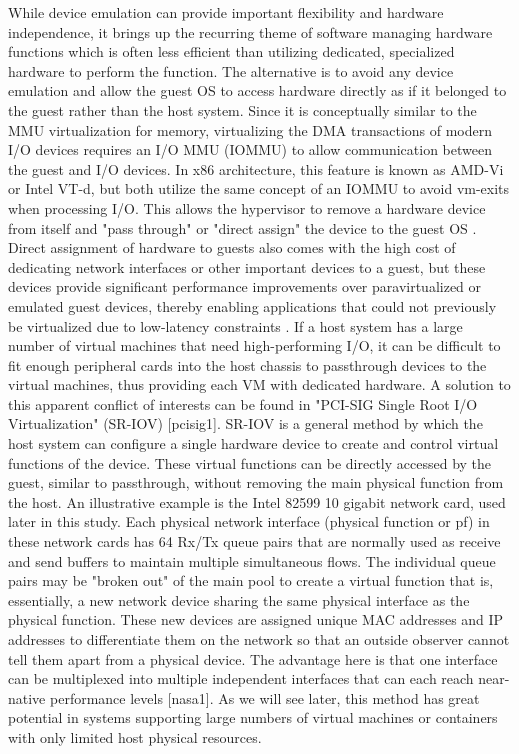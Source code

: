 While device emulation can provide important flexibility and hardware independence, it brings up the recurring theme of software managing hardware functions which is often less efficient than utilizing dedicated, specialized hardware to perform the function.  The alternative is to avoid any device emulation and allow the guest OS to access hardware directly as if it belonged to the guest rather than the host system.   Since it is conceptually similar to the MMU virtualization for memory, virtualizing the DMA transactions of modern I/O devices requires an I/O MMU (IOMMU) to allow communication between the guest and I/O devices.  In x86 architecture, this feature is known as AMD-Vi or Intel VT-d, but both utilize the same concept of an IOMMU to avoid vm-exits when processing I/O.  This allows the hypervisor to remove a hardware device from itself and "pass through" or "direct assign" the device to the guest OS \autocite{_jones_1}.  Direct assignment of hardware to guests also comes with the high cost of dedicating network interfaces or other important devices to a guest, but these devices provide significant performance improvements over paravirtualized or emulated guest devices, thereby enabling applications that could not previously be virtualized due to low-latency constraints \autocite{_jones_1}.  
If a host system has a large number of virtual machines that need high-performing I/O, it can be difficult to fit enough peripheral cards into the host chassis to passthrough devices to the virtual machines, thus providing each VM with dedicated hardware.  A solution to this apparent conflict of interests can be found in "PCI-SIG Single Root I/O Virtualization" (SR-IOV) [pcisig1].  SR-IOV is a general method by which the host system can configure a single hardware device to create and control virtual functions of the device.  These virtual functions can be directly accessed by the guest, similar to passthrough, without removing the main physical function from the host.  An illustrative example is the Intel 82599 10 gigabit network card, used later in this study.  Each physical network interface (physical function or pf) in these network cards has 64 Rx/Tx queue pairs that are normally used as receive and send buffers to maintain multiple simultaneous flows.  The individual queue pairs may be "broken out" of the main pool to create a virtual function that is, essentially, a new network device sharing the same physical interface as the physical function.  These new devices are assigned unique MAC addresses and IP addresses to differentiate them on the network so that an outside observer cannot tell them apart from a physical device.  The advantage here is that one interface can be multiplexed into multiple independent interfaces that can each reach near-native performance levels [nasa1].  As we will see later, this method has great potential in systems supporting large numbers of virtual machines or containers with only limited host physical resources.  


